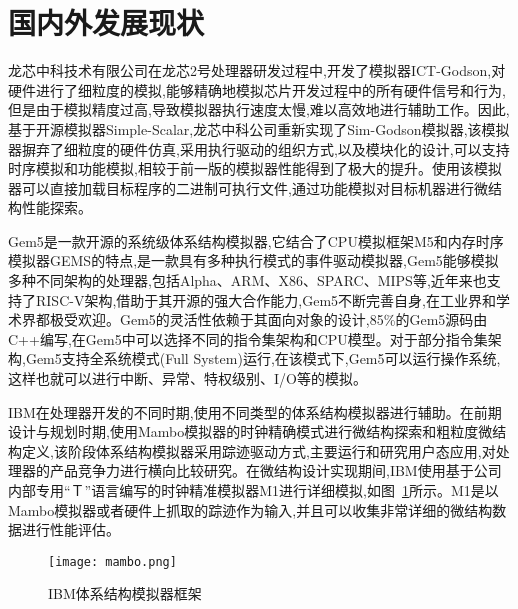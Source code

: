 \section{国内外发展现状}
龙芯中科技术有限公司在龙芯2号处理器研发过程中,开发了模拟器ICT-Godson\cite{gao2007simos},对硬件进行了细粒度的模拟,能够精确地模拟芯片开发过程中的所有硬件信号和行为,但是由于模拟精度过高,导致模拟器执行速度太慢,难以高效地进行辅助工作。因此,基于开源模拟器Simple-Scalar\cite{austin2002simplescalar},龙芯中科公司重新实现了Sim-Godson模拟器\cite{zhang2007sim},该模拟器摒弃了细粒度的硬件仿真,采用执行驱动的组织方式,以及模块化的设计,可以支持时序模拟和功能模拟\cite{zhang2007sim},相较于前一版的模拟器性能得到了极大的提升。使用该模拟器可以直接加载目标程序的二进制可执行文件,通过功能模拟对目标机器进行微结构性能探索\cite{desikan2001sim}。

Gem5是一款开源的系统级体系结构模拟器,它结合了CPU模拟框架M5和内存时序模拟器GEMS的特点,是一款具有多种执行模式的事件驱动模拟器\cite{许鹏2006一种应用于嵌入式系统中断控制},Gem5能够模拟多种不同架构的处理器,包括Alpha、ARM、X86、SPARC、MIPS等,近年来也支持了RISC-V架构,借助于其开源的强大合作能力,Gem5不断完善自身,在工业界和学术界都极受欢迎。Gem5的灵活性依赖于其面向对象的设计,85\%的Gem5源码由C++编写,在Gem5中可以选择不同的指令集架构和CPU模型。对于部分指令集架构,Gem5支持全系统模式(Full System)运行,在该模式下,Gem5可以运行操作系统,这样也就可以进行中断、异常、特权级别、I/O等的模拟。


IBM在处理器开发的不同时期,使用不同类型的体系结构模拟器进行辅助。在前期设计与规划时期,使用Mambo\cite{boh}模拟器的时钟精确模式进行微结构探索和粗粒度微结构定义,该阶段体系结构模拟器采用踪迹驱动方式\cite{ceze2003full},主要运行和研究用户态应用,对处理器的产品竞争力进行横向比较研究\cite{kistlerexperiences}。在微结构设计实现期间,IBM使用基于公司内部专用“Ｔ”语言\cite{asaad2012cycle,chaix2019implementation}编写的时钟精准模拟器M1进行详细模拟\cite{kistlerexperiences},如图~\ref{fig:IBM}所示。M1是以Mambo模拟器或者硬件上抓取的踪迹作为输入,并且可以收集非常详细的微结构数据进行性能评估\cite{magnusson2002simics}。
\begin{figure}[h]
  \centering
  \texttt{[image: mambo.png]}
  \caption{IBM体系结构模拟器框架}
  \label{fig:IBM}
\end{figure}  


